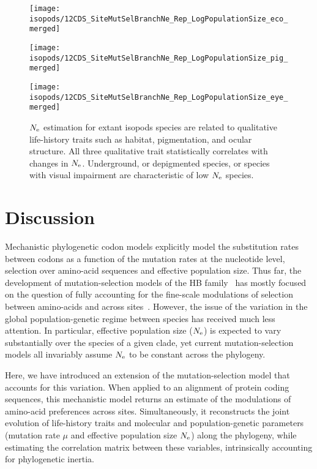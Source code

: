 \begin{figure}[htbp]
    \centering
    \begin{minipage}{0.32\linewidth}
        \texttt{[image: isopods/12CDS\_SiteMutSelBranchNe\_Rep\_LogPopulationSize\_eco\_merged]}
    \end{minipage} \hfill
    \begin{minipage}{0.32\linewidth}
        \texttt{[image: isopods/12CDS\_SiteMutSelBranchNe\_Rep\_LogPopulationSize\_pig\_merged]}
    \end{minipage} \hfill
    \begin{minipage}{0.32\linewidth}
        \texttt{[image: isopods/12CDS\_SiteMutSelBranchNe\_Rep\_LogPopulationSize\_eye\_merged]}
    \end{minipage}
    \caption[$\Ne$ as a function of traits in isopods]{
    $\Ne$ estimation for extant isopods species are related to qualitative life-history traits such as habitat, pigmentation, and ocular structure.
    All three qualitative trait statistically correlates with changes in $\Ne$.
    Underground, or depigmented species, or species with visual impairment are characteristic of low $\Ne$ species.}
    \label{fig:isopods_correlation}
\end{figure}


\section{Discussion}
\label{sec:Discussion}
Mechanistic phylogenetic \gls{codon} models explicitly model the \gls{substitution} rates between \glspl{codon} as a function of the mutation rates at the nucleotide level, selection over amino-acid sequences and \gls{effective population size}.
Thus far, the development of mutation-selection models of the \acrshort{HB} family~\citep{Rodrigue2010, Tamuri2012} has mostly focused on the question of fully accounting for the fine-scale modulations of selection between amino-acids and across sites~\citep{Rodrigue2010, Tamuri2012}.
However, the issue of the variation in the global population-genetic regime between species has received much less attention.
In particular, \gls{effective population size} ($\Ne$) is expected to vary substantially over the species of a given clade, yet current mutation-selection models all invariably assume $\Ne$ to be constant across the phylogeny.

Here, we have introduced an extension of the mutation-selection model that accounts for this variation.
When applied to an alignment of protein coding sequences, this mechanistic model returns an estimate of the modulations of amino-acid preferences across sites.
Simultaneously, it reconstructs the joint evolution of life-history traits and molecular and population-genetic parameters (mutation rate $\mu$ and \gls{effective population size} $\Ne$) along the phylogeny, while estimating the correlation matrix between these variables, intrinsically accounting for phylogenetic inertia.

